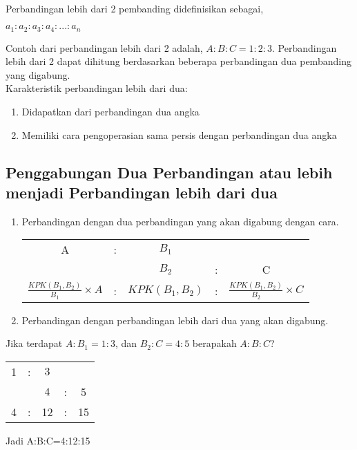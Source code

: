 \paragraph*{}
	Perbandingan lebih dari 2 pembanding didefinisikan sebagai,\\
	\begin{center}
		$a_1:a_2:a_3:a_4:...:a_n$
	\end{center}
	Contoh dari perbandingan lebih dari 2 adalah, $A:B:C=1:2:3$. Perbandingan lebih dari 2 dapat dihitung berdasarkan beberapa perbandingan dua pembanding yang digabung.
	\\
	Karakteristik perbandingan lebih dari dua:
	\begin{enumerate}
		\item Didapatkan dari perbandingan dua angka
		\item Memiliki cara pengoperasian sama persis dengan perbandingan dua angka
	\end{enumerate}
	
	\subsection{Penggabungan Dua Perbandingan atau lebih menjadi Perbandingan lebih dari dua}
	\begin{enumerate}
		\item Perbandingan dengan dua perbandingan yang akan digabung dengan cara.
		\begin{center}
			\begin{tabular}{ccccc}
				
				A&:&$B_1$& & \\
				& &$B_2$&:&C\\
				\hline
				$\frac{KPK(B_1,B_2)}{B_1}\times A$&: &$KPK(B_1,B_2)$&:&$\frac{KPK(B_1,B_2)}{B_2}\times C$
			\end{tabular}
		\end{center}
		\item Perbandingan dengan perbandingan lebih dari dua yang akan digabung.
	\end{enumerate}
	Jika terdapat $A:B_1=1:3$, dan $B_2:C=4:5$ berapakah $A:B:C$?
	\begin{center}
		\begin{tabular}{ccccc}
			
			1&:&$3$& & \\
			& &$4$&:&5\\
			\hline
			4&: &12&:&15
		\end{tabular}
	\end{center}
	Jadi A:B:C=4:12:15
	
	
	
	
	